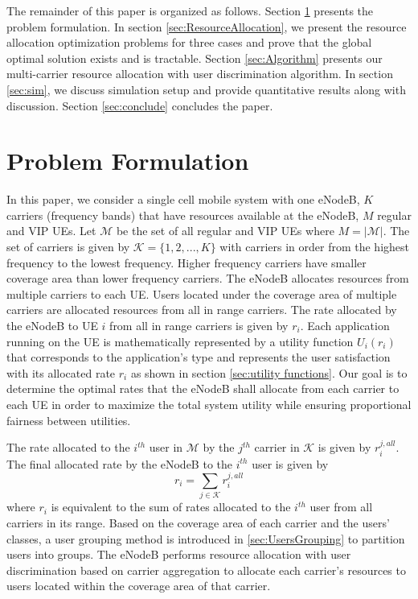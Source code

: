 \documentclass[journal]{IEEEtran} 				\IEEEoverridecommandlockouts 						\usepackage{amsmath,amssymb}
\begin{document}
The remainder of this paper is organized as follows. Section \ref{sec:Problem_formulation} presents the problem formulation. In section \ref{sec:ResourceAllocation}, we present the resource allocation optimization problems for three cases and prove that the global optimal solution exists and is tractable. Section \ref{sec:Algorithm} presents our multi-carrier resource allocation with user discrimination algorithm. In section \ref{sec:sim}, we discuss simulation setup and provide quantitative results along with discussion. Section \ref{sec:conclude} concludes the paper.
\section{Problem Formulation}\label{sec:Problem_formulation}
In this paper, we consider a single cell mobile system with one eNodeB, $K$ carriers (frequency bands) that have resources available at the eNodeB, $M$ regular and VIP UEs. Let $\mathcal{M}$ be the set of all regular and VIP UEs where $M=|\mathcal{M}|$. The set of carriers is given by $\mathcal{K}=\{1,2,...,K\}$ with carriers in order from the highest frequency to the lowest frequency. Higher frequency carriers have smaller coverage area than lower frequency carriers. The eNodeB allocates resources from multiple carriers to each UE. Users located under the coverage area of multiple carriers are allocated resources from all in range carriers.
The rate allocated by the eNodeB to UE $i$ from all in range carriers is given by $r_i$. Each application running on the UE is mathematically represented by a utility function $U_i(r_i)$ that corresponds to the application's type and represents the user satisfaction with its allocated rate $r_i$ as shown in section \ref{sec:utility functions}. Our goal is to determine the optimal rates that the eNodeB shall allocate from each carrier to each UE in order to maximize the total system utility while ensuring proportional fairness between utilities.

The rate allocated to the $i^{th}$ user in $\mathcal{M}$ by the $j^{th}$ carrier in $\mathcal{K}$ is given by $r_i^{j,all}$. The final allocated rate by the eNodeB to the $i^{th}$ user is given by
\begin{equation}\label{eqn:rate r_i}
r_i = \sum_{j\in \mathcal{K}}r_i^{j,all}
\end{equation}
where $r_i$ is equivalent to the sum of rates allocated to the $i^{th}$ user from all carriers in its range. Based on the coverage area of each carrier and the users' classes, a user grouping method is introduced in \ref{sec:UsersGrouping} to partition users into groups. The eNodeB performs resource allocation with user discrimination based on carrier aggregation to allocate each carrier's resources to users located within the coverage area of that carrier.
\end{document}
